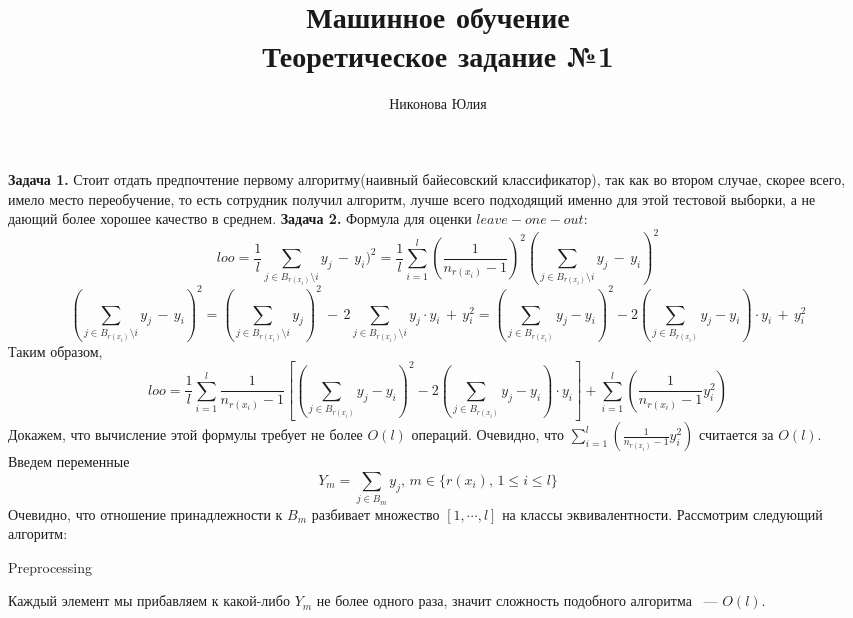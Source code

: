 \documentclass{article}
\title{Машинное обучение \\
Теоретическое задание №1}
\author{Никонова Юлия}
\date{}
\begin{document}
\maketitle
\textbf{Задача 1.} Стоит отдать предпочтение первому алгоритму(наивный байесовский классификатор), так как во втором случае, скорее всего, имело место переобучение, то есть сотрудник получил алгоритм, лучше всего подходящий именно для этой тестовой выборки, а не дающий более хорошее качество в среднем.
\newline
\textbf{Задача 2.}
Формула для оценки $leave-one-out$:
\begin{equation*}
loo = \frac{1}{l} \sum_{j \in B_{r(x_i)} \setminus i}
y_j \, - \, y_i)^2 = \frac{1}{l} \sum_{i=1}^{l}(\frac{1}{n_{r(x_i)}-1})^2(\sum_{j \in B_{r(x_i)} \setminus i} y_j \, - \, y_i)^2
\end{equation*}
\begin{equation*}
(\sum_{j \in B_{r(x_i)} \setminus i} y_j \, - \, y_i)^2 = (\sum_{j \in B_{r(x_i)} \setminus i} y_j)^2 \, - \, 2 \sum_{j \in B_{r(x_i)} \setminus i} y_j \cdot y_i \, + \, y_i^2
= ( \sum_{j \in B_{r(x_i)}} y_j - y_i)^2 - 2 (\sum_{j \in B_{r(x_i)} } y_j -y_i) \cdot y_i \, + \, y_i^2
\end{equation*}
Таким образом, 
\begin{equation*}
loo = \frac{1}{l} \sum_{i=1}^{l}\frac{1}{n_{r(x_i)}-1} [( \sum_{j \in B_{r(x_i)}} y_j - y_i)^2 - 2 (\sum_{j \in B_{r(x_i)} } y_j -y_i) \cdot y_i] + \sum_{i=1}^{l}(\frac{1}{n_{r(x_i)}-1} y_i^2)
\end{equation*}
Докажем, что вычисление этой формулы требует не более $O(l)$ операций.
Очевидно, что $\sum_{i=1}^{l}(\frac{1}{n_{r(x_i)}-1} y_i^2)$ считается за $O(l)$.
Введем переменные 
\begin{equation*}
Y_m= \sum_{j \in B_m } y_j, \, m \in \{ r(x_i), \, 1 \leqslant i \leqslant l \}
\end{equation*}
Очевидно, что отношение принадлежности к $B_m$ разбивает множество $[1, \cdots, l ]$ на классы эквивалентности.
\newline
Рассмотрим следующий алгоритм:
\newline
\begin{algorithm}[H]
\SetAlgoNoLine
{}
\caption{Preprocessing}
\end{algorithm}
Каждый элемент мы прибавляем к какой-либо $Y_m$ не более одного раза, значит сложность подобного алгоритма ~--- $O(l)$.
\end{document}
